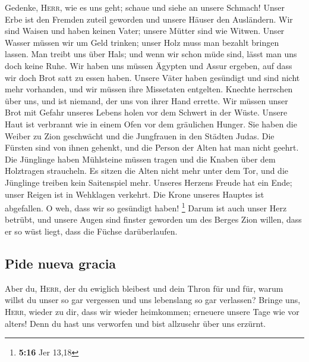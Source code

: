  Gedenke, \textsc{Herr}, wie es uns geht; schaue und siehe
an unsere Schmach!  Unser Erbe ist den Fremden zuteil
geworden und unsere Häuser den Ausländern.  Wir sind
Waisen und haben keinen Vater; unsere Mütter sind wie Witwen.
 Unser Wasser müssen wir um Geld trinken; unser Holz muss
man bezahlt bringen lassen.  Man treibt uns über Hals; und
wenn wir schon müde sind, lässt man uns doch keine Ruhe. 
Wir haben uns müssen Ägypten und Assur ergeben, auf dass wir doch Brot
satt zu essen haben.  Unsere Väter haben gesündigt und
sind nicht mehr vorhanden, und wir müssen ihre Missetaten entgelten.
 Knechte herrschen über uns, und ist niemand, der uns von
ihrer Hand errette.  Wir müssen unser Brot mit Gefahr
unseres Lebens holen vor dem Schwert in der Wüste. 
Unsere Haut ist verbrannt wie in einem Ofen vor dem gräulichen Hunger.
 Sie haben die Weiber zu Zion geschwächt und die
Jungfrauen in den Städten Judas.  Die Fürsten sind von
ihnen gehenkt, und die Person der Alten hat man nicht geehrt.
 Die Jünglinge haben Mühlsteine müssen tragen und die
Knaben über dem Holztragen straucheln.  Es sitzen die
Alten nicht mehr unter dem Tor, und die Jünglinge treiben kein
Saitenspiel mehr.  Unseres Herzens Freude hat ein Ende;
unser Reigen ist in Wehklagen verkehrt.  Die Krone
unseres Hauptes ist abgefallen. O weh, dass wir so gesündigt haben!
\footnote{\textbf{5:16} Jer 13,18}  Darum ist auch unser
Herz betrübt, und unsere Augen sind finster geworden  um
des Berges Zion willen, dass er so wüst liegt, dass die Füchse
darüberlaufen.

\hypertarget{pide-nueva-gracia}{%
\subsection{Pide nueva gracia}\label{pide-nueva-gracia}}

 Aber du, \textsc{Herr}, der du ewiglich bleibest und
dein Thron für und für,  warum willst du unser so gar
vergessen und uns lebenslang so gar verlassen?  Bringe
uns, \textsc{Herr}, wieder zu dir, dass wir wieder heimkommen; erneuere
unsere Tage wie vor alters!  Denn du hast uns verworfen
und bist allzusehr über uns erzürnt.
